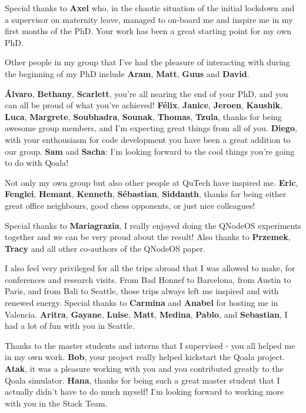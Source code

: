 Special thanks to \textbf{Axel} who, in the chaotic situation of the initial lockdown and a supervisor on maternity leave, managed to on-board me and inspire me in my first months of the PhD.
Your work has been a great starting point for my own PhD.

Other people in my group that I've had the pleasure of interacting with during the beginning of my PhD include
\textbf{Aram}, \textbf{Matt}, \textbf{Guus} and \textbf{David}.

\textbf{\'Alvaro}, \textbf{Bethany}, \textbf{Scarlett}, you're all nearing the end of your PhD, and you can all be proud of what you've achieved!
\textbf{F\'elix}, \textbf{Janice}, \textbf{Jeroen}, \textbf{Kaushik}, \textbf{Luca}, \textbf{Margrete}, \textbf{Soubhadra}, \textbf{Sounak}, \textbf{Thomas}, \textbf{Tzula}, thanks for being awesome group members, and I'm expecting great things from all of you.
\textbf{Diego}, with your enthousiasm for code development you have been a great addition to our group.
\textbf{Sam} and \textbf{Sacha}: I'm looking forward to the cool things you're going to do with Qoala!

Not only my own group but also other people at QuTech have inspired me.
\textbf{Eric}, \textbf{Fenglei}, \textbf{Hemant}, \textbf{Kenneth}, \textbf{S\'ebastian}, \textbf{Siddanth}, thanks for being either great office neighbours, good chess opponents, or just nice colleagues!

Special thanks to \textbf{Mariagrazia}, I really enjoyed doing the QNodeOS experiments together and we can be very proud about the result!
Also thanks to \textbf{Przemek}, \textbf{Tracy} and all other co-authors of the QNodeOS paper.

I also feel very privileged for all the trips abroad that I was allowed to make, for conferences and research visits.
From Bad Honnef to Barcelona, from Austin to Paris, and from Bali to Seattle, those trips always left me inspired and with renewed energy.
Special thanks to \textbf{Carmina} and \textbf{Anabel} for hosting me in Valencia.
\textbf{Aritra}, \textbf{Gayane}, \textbf{Luise}, \textbf{Matt}, \textbf{Medina}, \textbf{Pablo}, and \textbf{Sebastian}, I had a lot of fun with you in Seattle.

Thanks to the master students and interns that I supervised - you all helped me in my own work.
\textbf{Bob}, your project really helped kickstart the Qoala project.
\textbf{Atak}, it was a pleasure working with you and you contributed greatly to the Qoala simulator.
\textbf{Hana}, thanks for being such a great master student that I actually didn't have to do much myself!
I'm looking forward to working more with you in the Stack Team.


